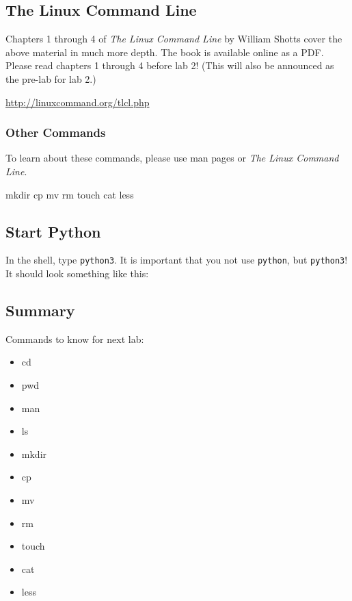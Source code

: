 \documentclass[11pt]{cselabheader}
\begin{document}
\subsection{The Linux Command Line}

Chapters 1 through 4 of \textit{The Linux Command Line} by William Shotts cover
the above material in much more depth. The book is available online as a PDF.
Please read chapters 1 through 4 before lab 2! (This will also be announced as
the pre-lab for lab 2.)
\begin{center}
  \url{http://linuxcommand.org/tlcl.php}
\end{center}

\subsubsection{Other Commands}

To learn about these commands, please use man pages or \textit{The Linux Command
Line}.

\begin{bashcode}
mkdir
cp
mv
rm
touch
cat
less
\end{bashcode}

\subsection{Start Python}

In the shell, type \texttt{python3}. It is important that you not use
\texttt{python}, but \texttt{python3}! It should look something like this:


\subsection{Summary}
\label{sec:linux.res}

Commands to know for next lab:
\begin{multicols}{3}
\begin{itemize}
  \item cd
  \item pwd
  \item man
  \item ls
  \item mkdir
  \item cp
  \item mv
  \item rm
  \item touch
  \item cat
  \item less
\end{itemize}
\end{multicols}
\end{document}
